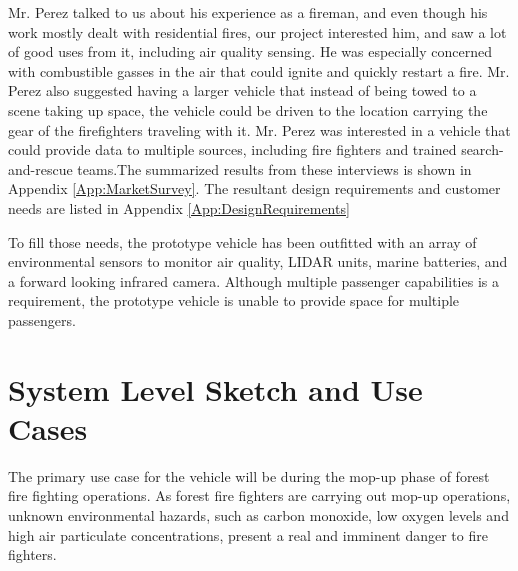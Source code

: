 Mr. Perez talked to us about his experience as a fireman, and even though his work mostly dealt with residential fires, our project interested him, and saw a lot of good uses from it, including air quality sensing. He was especially concerned with combustible gasses in the air that could ignite and quickly restart a fire. Mr. Perez also suggested having a larger vehicle that instead of being towed to a scene taking up space, the vehicle could be driven to the location carrying the gear of the firefighters traveling with it. Mr. Perez was interested in a vehicle that could provide data to multiple sources, including fire fighters and trained search-and-rescue teams.The summarized results from these interviews is shown in Appendix \ref{App:MarketSurvey}. The resultant design requirements and customer needs are listed in Appendix \ref{App:DesignRequirements} 

To fill those needs, the prototype vehicle has been outfitted with an array of environmental sensors to monitor air quality, LIDAR units, marine batteries, and a forward looking infrared camera. Although multiple passenger capabilities is a requirement, the prototype vehicle is unable to provide space for multiple passengers.

%
\section{System Level Sketch and Use Cases}
The primary use case for the vehicle will be during the mop-up phase of forest fire fighting operations. As forest fire fighters are carrying out mop-up operations, unknown environmental hazards, such as carbon monoxide, low oxygen levels and high air particulate concentrations,  present a real and imminent danger to fire fighters. 

